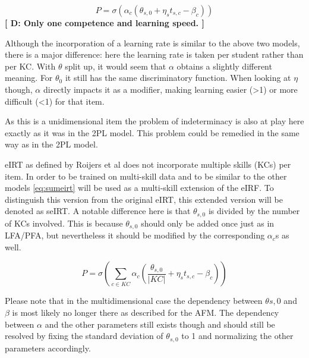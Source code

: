 \documentclass{scrartcl}
\providecommand{\comm}[1]{{\bf[ #1 ]}}
\providecommand{\commd}[1]{\comm{D: {#1}}}
\begin{document}
\begin{equation}
\label{eq:eirt}
P = \sigma(\alpha_{c} (\theta_{s,0} + \eta_{s} t_{s,c} - \beta_{c}))
\end{equation}
\commd{Only one competence and learning speed.}

Although the incorporation of a learning rate is similar to the above two models, there is a major difference: here the learning rate is taken per student rather than per KC. With $\theta$ split up, it would seem that $\alpha$ obtains a slightly different meaning. For $\theta_{0}$ it still has the same discriminatory function. When looking at $\eta$ though, $\alpha$ directly impacts it as a modifier, making learning easier (>1) or more difficult (<1) for that item.

As this is a unidimensional item the problem of indeterminacy is also at play here exactly as it was in the 2PL model. This problem could be remedied in the same way as in the 2PL model.

eIRT as defined by Roijers et al does not incorporate multiple skills (KCs) per item. In order to be trained on multi-skill data and to be similar to the other models \ref{eq:sumeirt} will be used as a multi-skill extension of the eIRF. To distinguish this version from the original eIRT, this extended version will be denoted as seIRT. A notable difference here is that $\theta_{s,0}$ is divided by the number of KCs involved. This is because $\theta_{s,0}$ should only be added once just as in LFA/PFA, but nevertheless it should be modified by the corresponding $\alpha_{c}$s as well.

\begin{equation}
\label{eq:sumeirt}
P = \sigma(\sum_{c \in KC} \alpha_{c}(\frac{\theta_{s,0}}{|KC|} + \eta_{s} t_{s,c} - \beta_{c}))
\end{equation}

Please note that in the multidimensional case the dependency between $\theta{s,0}$ and $\beta$ is most likely no longer there as described for the AFM. The dependency between $\alpha$ and the other parameters still exists though and should still be resolved by fixing the standard deviation of $\theta_{s,0}$ to 1 and normalizing the other parameters accordingly.
\end{document}
